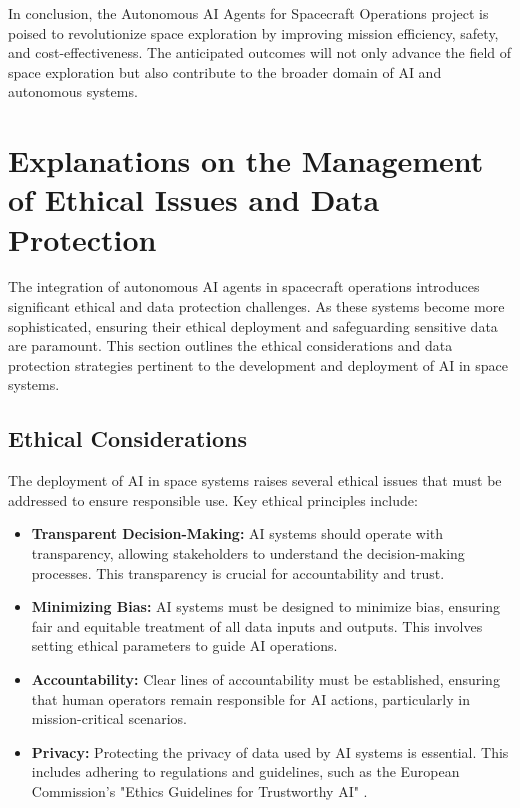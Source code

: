 \documentclass[a4paper,12pt]{article}
\begin{document}
In conclusion, the Autonomous AI Agents for Spacecraft Operations project is poised to revolutionize space exploration by improving mission efficiency, safety, and cost-effectiveness. The anticipated outcomes will not only advance the field of space exploration but also contribute to the broader domain of AI and autonomous systems.



\section{Explanations on the Management of Ethical Issues and Data Protection}

The integration of autonomous AI agents in spacecraft operations introduces significant ethical and data protection challenges. As these systems become more sophisticated, ensuring their ethical deployment and safeguarding sensitive data are paramount. This section outlines the ethical considerations and data protection strategies pertinent to the development and deployment of AI in space systems.

\subsection{Ethical Considerations}

The deployment of AI in space systems raises several ethical issues that must be addressed to ensure responsible use. Key ethical principles include:

\begin{itemize}
    \item \textbf{Transparent Decision-Making:} AI systems should operate with transparency, allowing stakeholders to understand the decision-making processes. This transparency is crucial for accountability and trust.
    \item \textbf{Minimizing Bias:} AI systems must be designed to minimize bias, ensuring fair and equitable treatment of all data inputs and outputs. This involves setting ethical parameters to guide AI operations.
    \item \textbf{Accountability:} Clear lines of accountability must be established, ensuring that human operators remain responsible for AI actions, particularly in mission-critical scenarios.
    \item \textbf{Privacy:} Protecting the privacy of data used by AI systems is essential. This includes adhering to regulations and guidelines, such as the European Commission's "Ethics Guidelines for Trustworthy AI" \cite{ec_guidelines_2018}.
\end{itemize}
\end{document}
